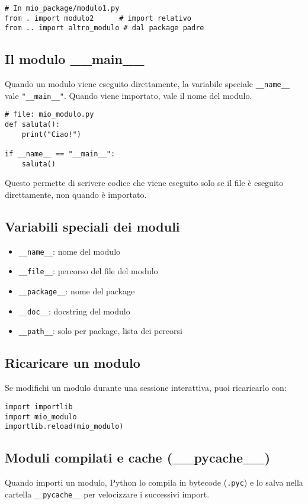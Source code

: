 \documentclass[a4paper,12pt]{article}
\begin{document}
\begin{lstlisting}
# In mio_package/modulo1.py
from . import modulo2      # import relativo
from .. import altro_modulo # dal package padre
\end{lstlisting}

\subsection*{Il modulo \_\_main\_\_}
Quando un modulo viene eseguito direttamente, la variabile speciale \texttt{\_\_name\_\_} vale \texttt{"\_\_main\_\_"}. Quando viene importato, vale il nome del modulo.

\begin{lstlisting}
# file: mio_modulo.py
def saluta():
    print("Ciao!")

if __name__ == "__main__":
    saluta()
\end{lstlisting}

Questo permette di scrivere codice che viene eseguito solo se il file è eseguito direttamente, non quando è importato.

\subsection*{Variabili speciali dei moduli}
\begin{itemize}
    \item \texttt{\_\_name\_\_}: nome del modulo
    \item \texttt{\_\_file\_\_}: percorso del file del modulo
    \item \texttt{\_\_package\_\_}: nome del package
    \item \texttt{\_\_doc\_\_}: docstring del modulo
    \item \texttt{\_\_path\_\_}: solo per package, lista dei percorsi
\end{itemize}

\subsection*{Ricaricare un modulo}
Se modifichi un modulo durante una sessione interattiva, puoi ricaricarlo con:

\begin{lstlisting}
import importlib
import mio_modulo
importlib.reload(mio_modulo)
\end{lstlisting}

\subsection*{Moduli compilati e cache (\_\_pycache\_\_)}
Quando importi un modulo, Python lo compila in bytecode (\texttt{.pyc}) e lo salva nella cartella \texttt{\_\_pycache\_\_} per velocizzare i successivi import.
\end{document}
